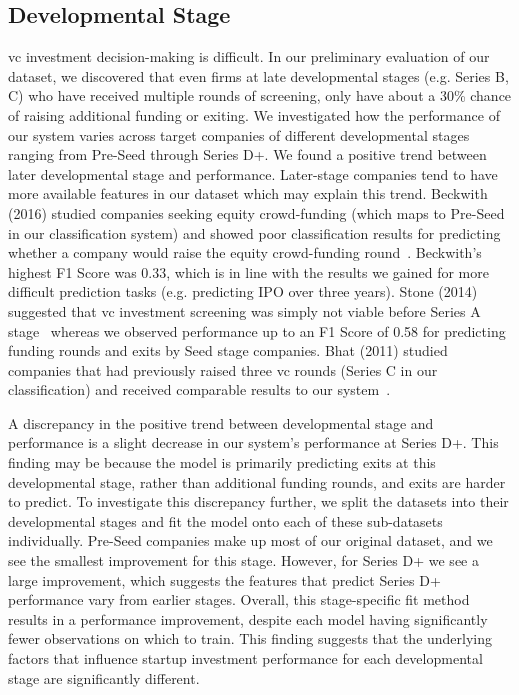 \documentclass[../thesis/thesis.tex]{subfiles}
\begin{document}
\subsection{Developmental Stage}

\Gls{vc} investment decision-making is difficult. In our preliminary evaluation of our dataset, we discovered that even firms at late developmental stages (e.g. Series B, C) who have received multiple rounds of screening, only have about a 30\% chance of raising additional funding or exiting. We investigated how the performance of our system varies across target companies of different developmental stages ranging from Pre-Seed through Series D+. We found a positive trend between later developmental stage and performance. Later-stage companies tend to have more available features in our dataset which may explain this trend. Beckwith (2016) studied companies seeking equity crowd-funding (which maps to Pre-Seed in our classification system) and showed poor classification results for predicting whether a company would raise the equity crowd-funding round~\cite{beckwith2016}. Beckwith's highest F1 Score was 0.33, which is in line with the results we gained for more difficult prediction tasks (e.g. predicting IPO over three years). Stone (2014) suggested that \gls{vc} investment screening was simply not viable before Series A stage~\cite{stone2014} whereas we observed performance up to an F1 Score of 0.58 for predicting funding rounds and exits by Seed stage companies. Bhat (2011) studied companies that had previously raised three \gls{vc} rounds (Series C in our classification) and received comparable results to our system~\cite{bhat2011}.

A discrepancy in the positive trend between developmental stage and performance is a slight decrease in our system's performance at Series D+. This finding may be because the model is primarily predicting exits at this developmental stage, rather than additional funding rounds, and exits are harder to predict. To investigate this discrepancy further, we split the datasets into their developmental stages and fit the model onto each of these sub-datasets individually. Pre-Seed companies make up most of our original dataset, and we see the smallest improvement for this stage. However, for Series D+ we see a large improvement, which suggests the features that predict Series D+ performance vary from earlier stages. Overall, this stage-specific fit method results in a performance improvement, despite each model having significantly fewer observations on which to train. This finding suggests that the underlying factors that influence startup investment performance for each developmental stage are significantly different.
\end{document}
